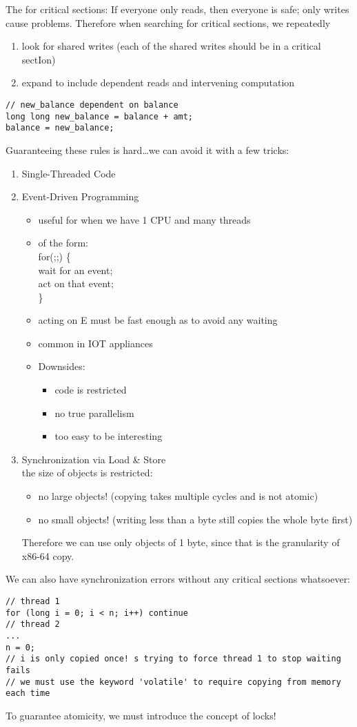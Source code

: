 \documentclass[../../lecture_notes.tex]{subfiles}
\begin{document}
The  for critical sections:
If everyone only reads, then everyone is safe; only writes cause problems. Therefore when searching for critical sections, we repeatedly
\begin{enumerate}
\item look for shared writes (each of the shared writes should be in a critical sectIon)
\item expand to include dependent reads and intervening computation
\end{enumerate}
\begin{lstlisting}
// new_balance dependent on balance
long long new_balance = balance + amt; 
balance = new_balance;
\end{lstlisting}


Guaranteeing these rules is hard…we can avoid it with a few tricks:
\begin{enumerate}
\item Single-Threaded Code
\item Event-Driven Programming
	\begin{itemize}
	\item useful for when we have 1 CPU and many threads
	\item of the form: \\
	for(;;) \{ \\
		wait for an event; \\
		act on that event; \\
	\}
	\item acting on E must be fast enough as to avoid any waiting
	\item common in IOT appliances
	\item Downsides:
	\begin{itemize}
		\item code is restricted
		\item no true parallelism
		\item too easy to be interesting 
	\end{itemize}
	\end{itemize}
\item Synchronization via Load \& Store \\
	the size of objects is restricted:
	\begin{itemize}[nosep]
		\item no large objects! (copying takes multiple cycles and is not atomic)
		\item no small objects! (writing less than a byte still copies the whole byte first)
	\end{itemize}
	Therefore we can use only objects of 1 byte, since that is the granularity of x86-64 copy.
\end{enumerate}


We can also have synchronization errors without any critical sections whatsoever:
\begin{lstlisting}
// thread 1
for (long i = 0; i < n; i++) continue
// thread 2
...
n = 0;
// i is only copied once! s trying to force thread 1 to stop waiting fails 
// we must use the keyword 'volatile' to require copying from memory each time
\end{lstlisting}

To guarantee atomicity, we must introduce the concept of locks!
\end{document}
